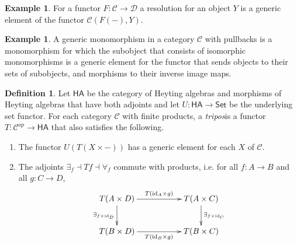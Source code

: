 \documentclass[sort&compress,draft]{elsarticle}
\theoremstyle{plain}
\theoremstyle{definition}
\newtheorem{definition}[theorem]{Definition}
\newtheorem{example}[theorem]{Example}
\theoremstyle{remark}
\newcommand\key[1]{\emph{#1}\label{#1}}
\newcommand\cat\mathcal
\newcommand\of:
\newcommand\id{\mathrm{id}}
\newcommand\Cat\mathsf
\newcommand\dual{^{op}}
\newcommand\Set{\Cat{Set}}
\begin{document}
\begin{example} For a functor $F\of \cat C\to\cat D$ a resolution for an object $Y$ is a generic element of the functor $\cat C(F(-),Y)$. \end{example}

\begin{example} A generic monomorphism in a category $\cat C$ with pullbacks is a monomorphism for which the subobject that consists of isomorphic monomorphisms is a generic element for the functor that sends objects to their sets of subobjects, and morphisms to their inverse image maps.\end{example}

\begin{definition}
Let $\Cat{HA}$ be the category of Heyting algebras and morphisms of Heyting algebras that have both adjoints and let $U\of\Cat{HA}\to \Set$ be the underlying set functor. For each category $\cat C$ with finite products, a \key{tripos} is a functor $T\of\cat C\dual\to \Cat{HA}$ that also satisfies the following.

\begin{enumerate} 
\item The functor $U(T(X\times -))$ has a generic element for each $X$ of $\cat C$.
\item The adjoints $\exists_f\dashv Tf \dashv \forall_f$ commute with products, i.e. for all $f\of A\to B$ and all $g\of C\to D$,
\[ \xymatrix{
T(A\times D) \ar[rr]^{T(\id_A\times g)} \ar[d]_{\exists_{f\times \id_D}}&& T(A\times C)\ar[d]^{\exists_{f\times \id_C}}\\
T(B\times D) \ar[rr]_{T(\id_B\times g)} && T(B\times C)
}\] 
\end{enumerate}
\end{definition}
\end{document}
